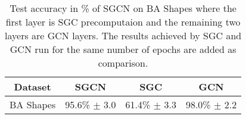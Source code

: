 \begin{table}[h]
    \centering
    \captionsetup{width=.9\textwidth}
    \begin{tabular}{c|c|cc}
        \textbf{Dataset} & \textbf{SGCN} & \textbf{SGC} & \textbf{GCN} \\
        \midrule
        BA Shapes       & 95.6\% $\pm$ 3.0 & 61.4\% $\pm$ 3.3 & 98.0\% $\pm$ 2.2 \\
    \end{tabular}
    \caption{Test accuracy in \% of SGCN on BA Shapes where the first layer is SGC precomputaion and the remaining two layers are GCN layers. The results achieved by SGC and GCN run for the same number of epochs are added as comparison.}
    \label{tab:SGCN-acc}
\end{table}

